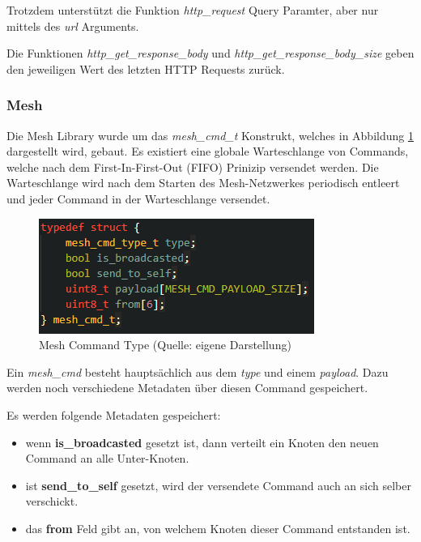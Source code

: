 Trotzdem unterstützt die Funktion \textit{http\_request} Query Paramter, aber nur mittels des \textit{url} Arguments.

Die Funktionen \textit{http\_get\_response\_body} und \textit{http\_get\_response\_body\_size} geben den jeweiligen Wert des letzten HTTP Requests zurück.

\subsubsection{Mesh}\label{sec:own-libraries-mesh}

Die Mesh Library wurde um das \textit{mesh\_cmd\_t} Konstrukt, welches in Abbildung \ref{abb:mesh_cmd_t} dargestellt wird, gebaut. Es existiert eine globale Warteschlange von Commands, welche nach dem First-In-First-Out (FIFO) Prinizip versendet werden. Die Warteschlange wird nach dem Starten des Mesh-Netzwerkes periodisch entleert und jeder Command in der Warteschlange versendet.

\begin{figure}[H]
    \begin{center}
        \includegraphics[scale=1]{images/mesh_cmd_t.png}
        \caption{Mesh Command Type (Quelle: eigene Darstellung)}
        \label{abb:mesh_cmd_t}
    \end{center}
\end{figure}

Ein \textit{mesh\_cmd} besteht hauptsächlich aus dem \textit{type} und einem \textit{payload}. Dazu werden noch verschiedene Metadaten über diesen Command gespeichert.

Es werden folgende Metadaten gespeichert:

\begin{itemize}
    \item wenn \textbf{is\_broadcasted} gesetzt ist, dann verteilt ein Knoten den neuen Command an alle Unter-Knoten. 
    \item ist \textbf{send\_to\_self} gesetzt, wird der versendete Command auch an sich selber verschickt.
    \item das \textbf{from} Feld gibt an, von welchem Knoten dieser Command entstanden ist.
\end{itemize}

